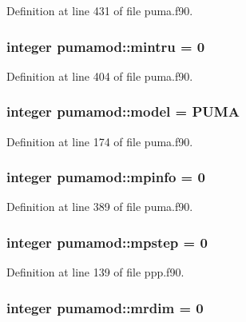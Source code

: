 \-Definition at line 431 of file puma.\-f90.

\hypertarget{classpumamod_af045ac8932ed34ae0d921a49d9696202}{
\subsubsection[{mintru}]{\setlength{\rightskip}{0pt plus 5cm}integer {\bf pumamod\-::mintru} = 0}}
\label{classpumamod_af045ac8932ed34ae0d921a49d9696202}


\-Definition at line 404 of file puma.\-f90.

\hypertarget{classpumamod_a7b22b37e933bb9e2b91022f17891b322}{
\subsubsection[{model}]{\setlength{\rightskip}{0pt plus 5cm}integer {\bf pumamod\-::model} = {\bf \-P\-U\-M\-A}}}
\label{classpumamod_a7b22b37e933bb9e2b91022f17891b322}


\-Definition at line 174 of file puma.\-f90.

\hypertarget{classpumamod_a34212fc920287542d5b665298e229090}{
\subsubsection[{mpinfo}]{\setlength{\rightskip}{0pt plus 5cm}integer {\bf pumamod\-::mpinfo} = 0}}
\label{classpumamod_a34212fc920287542d5b665298e229090}


\-Definition at line 389 of file puma.\-f90.

\hypertarget{classpumamod_ae82bde2eb42c2fab72e9d6c5d7b009f7}{
\subsubsection[{mpstep}]{\setlength{\rightskip}{0pt plus 5cm}integer {\bf pumamod\-::mpstep} = 0}}
\label{classpumamod_ae82bde2eb42c2fab72e9d6c5d7b009f7}


\-Definition at line 139 of file ppp.\-f90.

\hypertarget{classpumamod_adefb6afc38014b7c141a67f0036bb9fd}{
\subsubsection[{mrdim}]{\setlength{\rightskip}{0pt plus 5cm}integer {\bf pumamod\-::mrdim} = 0}}
\label{classpumamod_adefb6afc38014b7c141a67f0036bb9fd}


